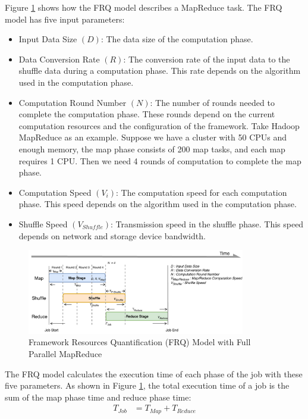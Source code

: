 {Figure \ref{fig:model_basic} shows how the FRQ model describes a MapReduce task. The FRQ model has five input parameters:
\begin{itemize}
	\item Input Data Size \((D)\): The data size of the computation phase.
	\item Data Conversion Rate \((R)\): The conversion rate of the input data to the shuffle data during a computation phase. This rate depends on the algorithm used in the computation phase.
    \item Computation Round Number \((N)\): The number of rounds needed to complete the computation phase. These rounds depend on the current computation resources and the configuration of the framework. Take Hadoop MapReduce as an example. Suppose we have a cluster with 50 CPUs and enough memory, the map phase consists of 200 map tasks, and each map requires 1 CPU. Then we need 4 rounds of computation to complete the map phase.
    \item Computation Speed \((V_{i})\): 
    The computation speed for each computation phase. This speed depends on the algorithm used in the computation phase.
    \item Shuffle Speed \((V_{Shuffle})\): 
    Transmission speed in the shuffle phase. This speed depends on network and storage device bandwidth.
\end{itemize}

\begin{figure}
    \centering
	\includegraphics[width=0.85\textwidth]{fig/model_basic}
	\caption{\color{blue}Framework Resources Quantification (FRQ) Model with Full Parallel MapReduce}
    \label{fig:model_basic}
    \vspace{-1em}
\end{figure}
The FRQ model calculates the execution time of each phase of the job with these five parameters. As shown in Figure \ref{fig:model_basic}, the total execution time of a job is the sum of the map phase time and reduce phase time:
\begin{equation}
\label{equation_Tjob}
\begin{aligned}
    T_{Job} &= T_{Map} + T_{Reduce}
\end{aligned}
\end{equation}

}

